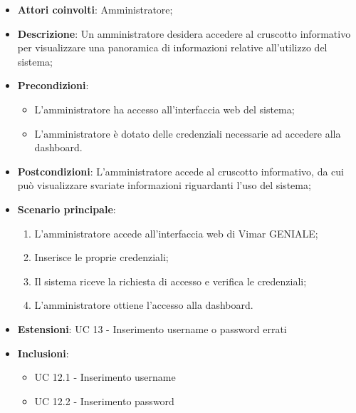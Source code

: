 \begin{itemize}
    \item \textbf{Attori coinvolti}: Amministratore;
    \item \textbf{Descrizione}: Un amministratore desidera accedere al cruscotto informativo per visualizzare una panoramica di informazioni relative all’utilizzo del sistema;
    \item \textbf{Precondizioni}: 
        \begin{itemize}
            \item L’amministratore ha accesso all’interfaccia web del sistema;
            \item L’amministratore è dotato delle credenziali necessarie ad accedere alla dashboard.
        \end{itemize}
    \item \textbf{Postcondizioni}: L’amministratore accede al cruscotto informativo, da cui può visualizzare svariate informazioni riguardanti l’uso del sistema;
    \item \textbf{Scenario principale}:
    \begin{enumerate}
    \item L’amministratore accede all’interfaccia web di Vimar GENIALE;
    \item Inserisce le proprie credenziali;
    \item Il sistema riceve la richiesta di accesso e verifica le credenziali;
    \item L’amministratore ottiene l’accesso alla dashboard.
    \end{enumerate}
    \item \textbf{Estensioni}: UC 13 - Inserimento username o password errati
    \item \textbf{Inclusioni}: 
        \begin{itemize}
            \item UC 12.1 - Inserimento username
            \item UC 12.2 - Inserimento password
        \end{itemize}
\end{itemize}

